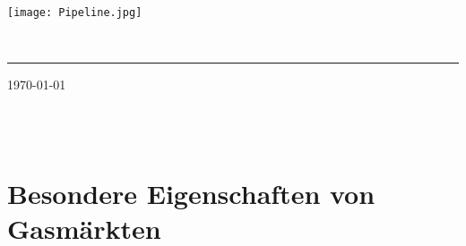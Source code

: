\documentclass[11pt,a4paper]{article}
\begin{document}
\sffamily   %
\hfill%
\begin{minipage}[t]{.6\textwidth}
\raggedleft%
\texttt{[image: Pipeline.jpg]}


\end{minipage}\\[0.5em]
%
{\color{firstnamecolor}\rule{\textwidth}{.25ex}}
%
\begin{minipage}[t]{.4\textwidth}
	\raggedright%
	\vspace*{1em}

	\small%
\end{minipage}
%
\hfill
%
\begin{minipage}[t]{.4\textwidth}
	\raggedleft %
	\today
\end{minipage}\\[2.2em]


{\bfseries {}}\\[0.75em]

\section*{\textsf{Besondere Eigenschaften von Gasmärkten}}
\end{document}
